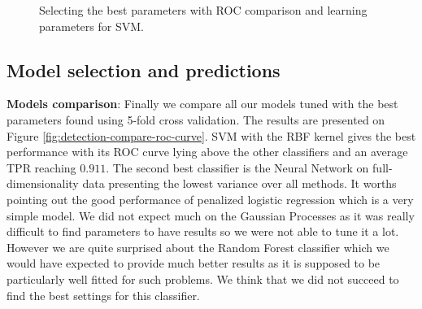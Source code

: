 \documentclass[10pt,a4paper]{article}
\begin{document}
     \begin{figure}[ht]
       \center
    	\hfill
	\caption{Selecting the best parameters with ROC comparison and learning parameters for SVM.}

  \end{figure}


  \subsection{Model selection and predictions}
    \textbf{Models comparison}: Finally we compare all our models tuned with the best parameters found using 5-fold cross validation. The results are presented on Figure \ref{fig:detection-compare-roc-curve}. SVM with the RBF kernel gives the best performance with its ROC curve lying above the other classifiers and an average TPR reaching $0.911$. The second best classifier is the Neural Network on full-dimensionality data presenting the lowest variance over all methods. It worths pointing out the good performance of penalized logistic regression which is a very simple model. We did not expect much on the Gaussian Processes as it was really difficult to find parameters to have results so we were not able to tune it a lot. However we are quite surprised about the Random Forest classifier which we would have expected to provide much better results as it is supposed to be particularly well fitted for such problems. We think that we did not succeed to find the best settings for this classifier.
\end{document}
